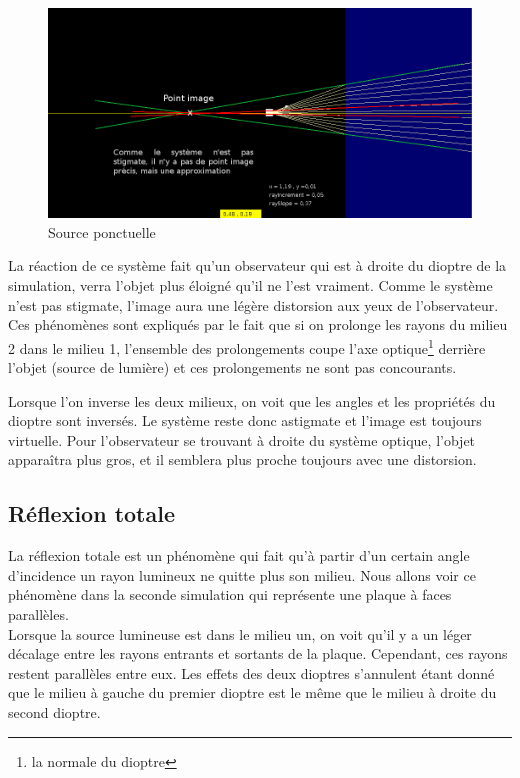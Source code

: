 \begin{figure}[H]
      \center
      \includegraphics[width=14cm]{ressources/tp1/source_ponctuelle1.png}
      \caption{Source ponctuelle}
\end{figure}

La réaction de ce système fait qu'un observateur qui est à droite du dioptre de la simulation, verra l'objet plus 
éloigné qu'il ne l'est vraiment. Comme le système n'est pas stigmate, l'image aura une légère distorsion aux yeux 
de l'observateur. Ces phénomènes sont expliqués par le fait que si on prolonge les rayons du milieu 2 dans le milieu 1,
l'ensemble des prolongements coupe l'axe optique\footnote{la normale du dioptre} derrière l'objet (source de lumière) et 
ces prolongements ne sont pas concourants.\newline

Lorsque l'on inverse les deux milieux, on voit que les angles et les propriétés du dioptre sont inversés. Le système reste donc astigmate 
et l'image est toujours virtuelle.
Pour l'observateur se trouvant à droite du système optique, l'objet apparaîtra plus gros, et il semblera plus proche toujours avec une distorsion.

\subsection{Réflexion totale}

La réflexion totale est un phénomène qui fait qu'à partir d'un certain angle d'incidence un rayon lumineux ne quitte plus son milieu.
Nous allons voir ce phénomène dans la seconde simulation qui représente une plaque à faces parallèles.\\

Lorsque la source lumineuse est dans le milieu un, on voit qu'il y a un léger décalage entre les rayons entrants et sortants de la plaque.
Cependant, ces rayons restent parallèles entre eux.
Les effets des deux dioptres s'annulent étant donné que le milieu à gauche du premier dioptre est le même que le milieu à 
droite du second dioptre.\newline

